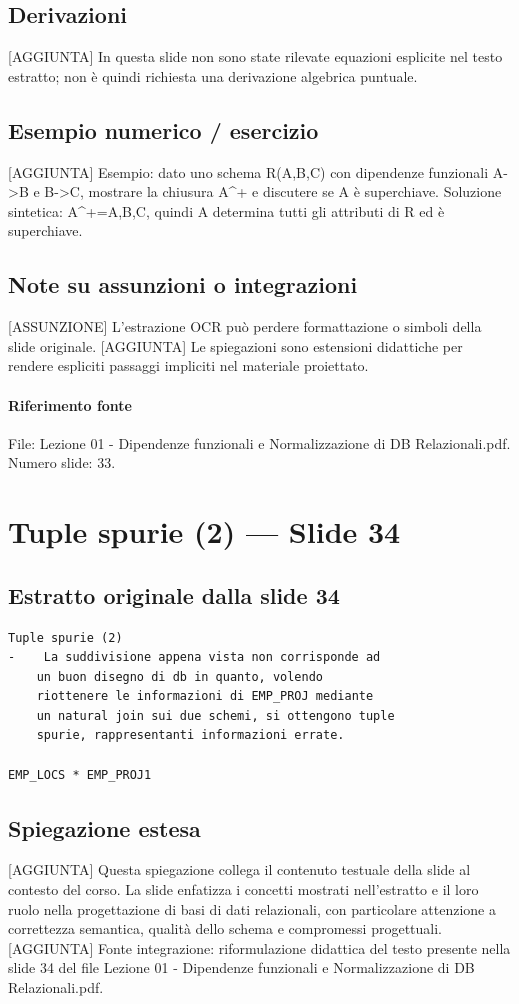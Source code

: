 \documentclass[11pt]{article}
\begin{document}
\subsection*{Derivazioni}
[AGGIUNTA] In questa slide non sono state rilevate equazioni esplicite nel testo estratto; non è quindi richiesta una derivazione algebrica puntuale.
\subsection*{Esempio numerico / esercizio}
[AGGIUNTA] Esempio: dato uno schema R(A,B,C) con dipendenze funzionali A->B e B->C, mostrare la chiusura A^+ e discutere se A è superchiave. Soluzione sintetica: A^+={A,B,C}, quindi A determina tutti gli attributi di R ed è superchiave.
\subsection*{Note su assunzioni o integrazioni}
[ASSUNZIONE] L'estrazione OCR può perdere formattazione o simboli della slide originale.
[AGGIUNTA] Le spiegazioni sono estensioni didattiche per rendere espliciti passaggi impliciti nel materiale proiettato.
\paragraph{Riferimento fonte} File: Lezione 01 - Dipendenze funzionali e Normalizzazione di DB Relazionali.pdf. Numero slide: 33.
\section{Tuple spurie (2) --- Slide 34}
\subsection*{Estratto originale dalla slide 34}
\begin{lstlisting}
Tuple spurie (2)
-    La suddivisione appena vista non corrisponde ad
    un buon disegno di db in quanto, volendo
    riottenere le informazioni di EMP_PROJ mediante
    un natural join sui due schemi, si ottengono tuple
    spurie, rappresentanti informazioni errate.

EMP_LOCS * EMP_PROJ1
\end{lstlisting}
\subsection*{Spiegazione estesa}
[AGGIUNTA] Questa spiegazione collega il contenuto testuale della slide al contesto del corso. La slide enfatizza i concetti mostrati nell'estratto e il loro ruolo nella progettazione di basi di dati relazionali, con particolare attenzione a correttezza semantica, qualità dello schema e compromessi progettuali.
[AGGIUNTA] Fonte integrazione: riformulazione didattica del testo presente nella slide 34 del file Lezione 01 - Dipendenze funzionali e Normalizzazione di DB Relazionali.pdf.
\end{document}
